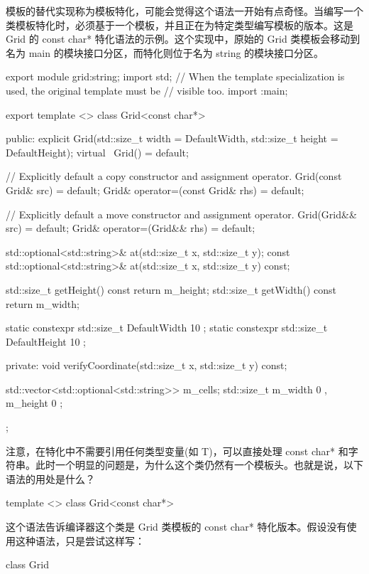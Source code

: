 模板的替代实现称为模板特化，可能会觉得这个语法一开始有点奇怪。当编写一个类模板特化时，必须基于一个模板，并且正在为特定类型编写模板的版本。这是 Grid 的 const char* 特化语法的示例。这个实现中，原始的 Grid 类模板会移动到名为 main 的模块接口分区，而特化则位于名为 string 的模块接口分区。

\begin{cpp}
export module grid:string;
import std;
// When the template specialization is used, the original template must be
// visible too.
import :main;

export template <>
class Grid<const char*>
{
    public:
        explicit Grid(std::size_t width = DefaultWidth,
            std::size_t height = DefaultHeight);
        virtual ~Grid() = default;

        // Explicitly default a copy constructor and assignment operator.
        Grid(const Grid& src) = default;
        Grid& operator=(const Grid& rhs) = default;

        // Explicitly default a move constructor and assignment operator.
        Grid(Grid&& src) = default;
        Grid& operator=(Grid&& rhs) = default;

        std::optional<std::string>& at(std::size_t x, std::size_t y);
        const std::optional<std::string>& at(std::size_t x, std::size_t y) const;

        std::size_t getHeight() const { return m_height; }
        std::size_t getWidth() const { return m_width; }

        static constexpr std::size_t DefaultWidth { 10 };
        static constexpr std::size_t DefaultHeight { 10 };

    private:
        void verifyCoordinate(std::size_t x, std::size_t y) const;

        std::vector<std::optional<std::string>> m_cells;
        std::size_t m_width { 0 }, m_height { 0 };
};
\end{cpp}

注意，在特化中不需要引用任何类型变量(如 T)，可以直接处理 const char* 和字符串。此时一个明显的问题是，为什么这个类仍然有一个模板头。也就是说，以下语法的用处是什么？

\begin{cpp}
template <>
class Grid<const char*>
\end{cpp}

这个语法告诉编译器这个类是 Grid 类模板的 const char* 特化版本。假设没有使用这种语法，只是尝试这样写：

\begin{cpp}
class Grid
\end{cpp}

